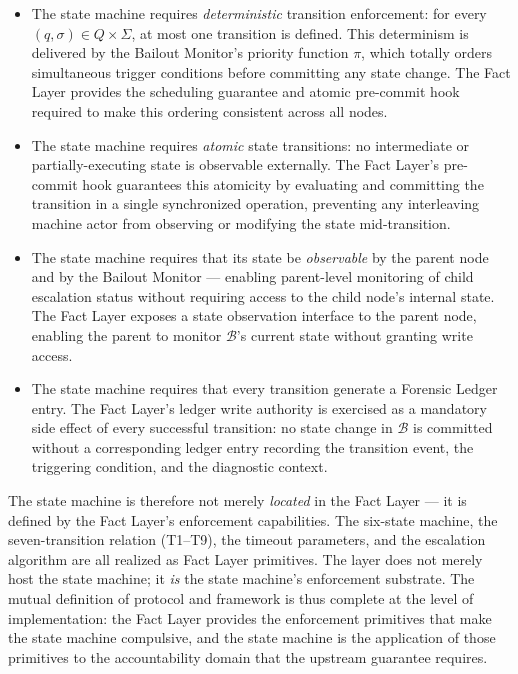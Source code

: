 \begin{itemize}\itemsep=0pt
\item The state machine requires \emph{deterministic} transition enforcement: for every $(q, \sigma) \in Q \times \Sigma$, at most one transition is defined. This determinism is delivered by the Bailout Monitor's priority function $\pi$, which totally orders simultaneous trigger conditions before committing any state change. The Fact Layer provides the scheduling guarantee and atomic pre-commit hook required to make this ordering consistent across all nodes.

\item The state machine requires \emph{atomic} state transitions: no intermediate or partially-executing state is observable externally. The Fact Layer's pre-commit hook guarantees this atomicity by evaluating and committing the transition in a single synchronized operation, preventing any interleaving machine actor from observing or modifying the state mid-transition.

\item The state machine requires that its state be \emph{observable} by the parent node and by the Bailout Monitor --- enabling parent-level monitoring of child escalation status without requiring access to the child node's internal state. The Fact Layer exposes a state observation interface to the parent node, enabling the parent to monitor $\mathcal{B}$'s current state without granting write access.

\item The state machine requires that every transition generate a Forensic Ledger entry. The Fact Layer's ledger write authority is exercised as a mandatory side effect of every successful transition: no state change in $\mathcal{B}$ is committed without a corresponding ledger entry recording the transition event, the triggering condition, and the diagnostic context.
\end{itemize}

The state machine is therefore not merely \emph{located} in the Fact Layer --- it is defined by the Fact Layer's enforcement capabilities. The six-state machine, the seven-transition relation (T1--T9), the timeout parameters, and the escalation algorithm are all realized as Fact Layer primitives. The \fact{} layer does not merely host the state machine; it \emph{is} the state machine's enforcement substrate. The mutual definition of protocol and framework is thus complete at the level of implementation: the Fact Layer provides the enforcement primitives that make the state machine compulsive, and the state machine is the application of those primitives to the accountability domain that the upstream guarantee requires.

